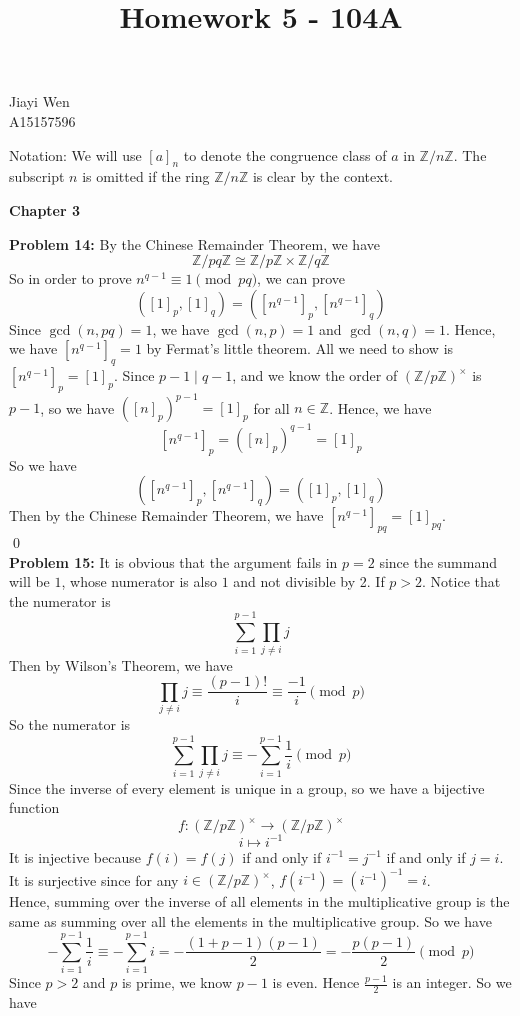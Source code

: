 \documentclass[12pt]{amsart}
\newcommand{\Z}{\mathbb{Z}}
\begin{document}
\title{Homework 5 - 104A}
\maketitle
\begin{center}
    Jiayi Wen\\
    A15157596
\end{center}
Notation: We will use $[a]_n$ to denote the congruence class of $a$ in $\Z/n\Z$. The subscript $n$ is omitted if the ring $\Z/n\Z$ is clear by the context.
\begin{center}
    \textbf{Chapter 3}
\end{center}
\textbf{Problem 14:} By the Chinese Remainder Theorem, we have 
\[\Z/pq\Z\cong \Z/p\Z\times \Z/q\Z\]
So in order to prove $n^{q-1}\equiv 1 \pmod{pq}$, we can prove 
\[([1]_p,[1]_q)=([n^{q-1}]_p,[n^{q-1}]_q)\]
Since $\gcd(n,pq)=1$, we have $\gcd(n,p)=1$ and $\gcd(n,q)=1$. Hence, we have 
$[n^{q-1}]_q=1$ by Fermat's little theorem. All we need to show is $[n^{q-1}]_p=[1]_p$. Since $p-1\mid q-1$, and we know the order of $(\Z/p\Z)^\times$ is $p-1$, so we have $([n]_p)^{p-1}=[1]_p$ for all $n\in\Z$. Hence, we have 
\[[n^{q-1}]_p=([n]_p)^{q-1}=[1]_p\]
So we have 
\[([n^{q-1}]_p,[n^{q-1}]_q)=([1]_p,[1]_q)\]
Then by the Chinese Remainder Theorem, we have $[n^{q-1}]_{pq}=[1]_{pq}$.
\\\qed\\
\textbf{Problem 15:} It is obvious that the argument fails in $p=2$ since the summand will be $1$, whose numerator is also $1$ and not divisible by 2. If $p>2$. Notice that the numerator is 
\[\sum_{i=1}^{p-1}\prod_{j\neq i}j\]
Then by Wilson's Theorem, we have 
\[\prod_{j\neq i}j\equiv \frac{(p-1)!}{i}\equiv \frac{-1}{i}\pmod p\]
So the numerator is 
\[\sum_{i=1}^{p-1}\prod_{j\neq i}j\equiv -\sum_{i=1}^{p-1}\frac{1}{i}\pmod p\]
Since the inverse of every element is unique in a group, so we have a bijective function 
\[f:(\Z/p\Z)^\times \to (\Z/p\Z)^\times \]
\[i\mapsto i^{-1}\]
It is injective because $f(i)=f(j)$ if and only if $i^{-1}=j^{-1}$  if and only if $j=i$.\\
It is surjective since for any $i\in (\Z/p\Z)^\times$, $f(i^{-1})=(i^{-1})^{-1}=i$.\\
Hence, summing over the inverse of all elements in the multiplicative group is the same as summing over all the elements in the multiplicative group. So we have 
\[-\sum_{i=1}^{p-1}\frac{1}{i}\equiv -\sum_{i=1}^{p-1}i=-\frac{(1+p-1)(p-1)}{2}=-\frac{p(p-1)}{2}\pmod p\]
Since $p>2$ and $p$ is prime, we know $p-1$ is even. Hence $\frac{p-1}{2}$ is an integer. So we have 
\end{document}
